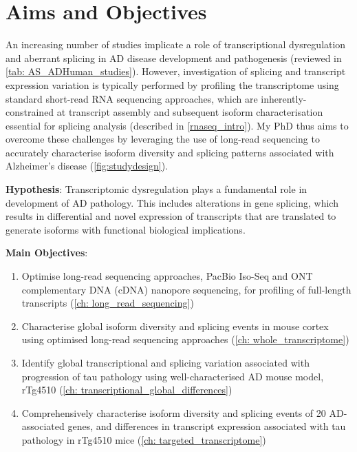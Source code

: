 \section{Aims and Objectives}
An increasing number of studies implicate a role of transcriptional dysregulation and aberrant splicing in AD disease development and pathogenesis (reviewed in \cref{tab: AS_ADHuman_studies}). However, investigation of splicing and transcript expression variation is typically performed by profiling the transcriptome using standard short-read RNA sequencing approaches, which are inherently-constrained at transcript assembly and subsequent isoform characterisation essential for splicing analysis (described in \cref{rnaseq_intro}). My PhD thus aims to overcome these challenges by leveraging the use of long-read sequencing to accurately characterise isoform diversity and splicing patterns associated with Alzheimer's disease (\cref{fig:studydesign}).


\textbf{Hypothesis}: Transcriptomic dysregulation plays a fundamental role in development of AD pathology. This includes alterations in gene splicing, which results in differential and novel expression of transcripts that are translated to generate isoforms with functional biological implications. 

\textbf{Main Objectives}:

\begin{enumerate}[]
	\item Optimise long-read sequencing approaches, PacBio Iso-Seq and ONT complementary DNA (cDNA) nanopore sequencing, for profiling of full-length transcripts (\cref{ch: long_read_sequencing}) 
	\item Characterise global isoform diversity and splicing events in mouse cortex using optimised long-read sequencing approaches (\cref{ch: whole_transcriptome}) 
	\item Identify global transcriptional and splicing variation associated with progression of tau pathology using well-characterised AD mouse model, rTg4510 (\cref{ch: transcriptional_global_differences})
	\item Comprehensively characterise isoform diversity and splicing events of 20 AD-associated genes, and differences in transcript expression associated with tau pathology in rTg4510 mice (\cref{ch: targeted_transcriptome})
\end{enumerate}


